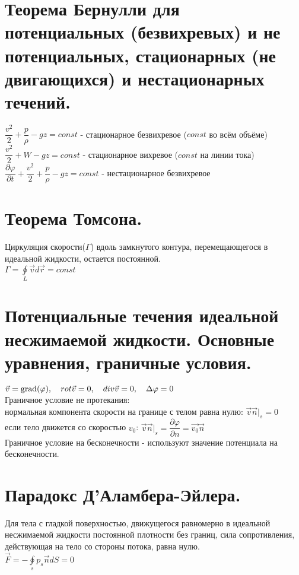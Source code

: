 \begin{multicols*}{2}
		\section{Теорема Бернулли для потенциальных (безвихревых) и не потенциальных, стационарных (не двигающихся) и нестационарных течений.} 
		$\dfrac{v^2}{2}+\dfrac{p}{\rho}-gz=const$ - стационарное безвихревое ($const$ во всём объёме)\\
		$\dfrac{v^2}{2}+W-gz=const$ - стационарное вихревое ($const$ на линии тока)\\
		$\dfrac{\partial \varphi}{\partial t}+\dfrac{v^2}{2}+\dfrac{p}{\rho}-gz=const$ - нестационарное безвихревое \\
		
		\section{Теорема Томсона.}
		Циркуляция скорости($\Gamma$) вдоль замкнутого контура, перемещающегося в идеальной жидкости, остается постоянной. \\
		$\Gamma = \oint\limits_L\vec{v}d\vec{r}=const$
		
		\section{Потенциальные течения идеальной несжимаемой жидкости. Основные уравнения, граничные условия.}
		$\vec{v}=\operatorname{grad}(\varphi),\quad rot\vec{v} = 0,\quad div\vec{v} = 0,\quad \Delta \varphi=0$\\
		Граничное условие не протекания: \\
		нормальная компонента скорости на границе с телом равна нулю: $\vec{v}\vec{n}|_s=0$\\
		если тело движется со скоростью $v_0$: $\vec{v}\vec{n}|_s=\dfrac{\partial\varphi}{\partial n}=\vec{v_0}\vec{n}$ \\
		Граничное условие на бесконечности - используют значение потенциала на бесконечности.%
		
		\section{Парадокс Д’Аламбера-Эйлера.}
		Для тела с гладкой поверхностью, движущегося равномерно в идеальной несжимаемой жидкости постоянной плотности без границ, сила сопротивления, действующая на тело со стороны потока, равна нулю.\\
		$\vec{F}=-\oint\limits_sp_s\vec{n}dS=0$
		

\end{multicols*}
